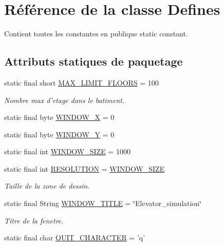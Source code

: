 \hypertarget{classDefines}{\section{Référence de la classe Defines}
\label{classDefines}
}


Contient toutes les constantes en publique static constant.  


\subsection*{Attributs statiques de paquetage}
\begin{DoxyCompactItemize}
\item 
static final short \hyperlink{classDefines_af60ebfd414a20ac9a7071d1d2a8cddca}{M\-A\-X\-\_\-\-L\-I\-M\-I\-T\-\_\-\-F\-L\-O\-O\-R\-S} = 100
\begin{DoxyCompactList}\small\item\em Nombre max d'etage dans le batiment. \end{DoxyCompactList}\item 
static final byte \hyperlink{classDefines_a191ee33a73c60eed6efed2b7dfd5947d}{W\-I\-N\-D\-O\-W\-\_\-\-X} = 0
\item 
static final byte \hyperlink{classDefines_a15d26191713a84100e6850d2ba539d8f}{W\-I\-N\-D\-O\-W\-\_\-\-Y} = 0
\item 
static final int \hyperlink{classDefines_aafb660e1c1534aec4d2cee6cfe57029f}{W\-I\-N\-D\-O\-W\-\_\-\-S\-I\-Z\-E} = 1000
\item 
static final int \hyperlink{classDefines_acd16804e8dcad6ce6fe8ad2e1b3f99e0}{R\-E\-S\-O\-L\-U\-T\-I\-O\-N} = \hyperlink{classDefines_aafb660e1c1534aec4d2cee6cfe57029f}{W\-I\-N\-D\-O\-W\-\_\-\-S\-I\-Z\-E}
\begin{DoxyCompactList}\small\item\em Taille de la zone de dessin. \end{DoxyCompactList}\item 
static final String \hyperlink{classDefines_a4f7489d3112fc05c39005576c0783f92}{W\-I\-N\-D\-O\-W\-\_\-\-T\-I\-T\-L\-E} = \char`\"{}Elevator\-\_\-simulation\char`\"{}
\begin{DoxyCompactList}\small\item\em Titre de la fenetre. \end{DoxyCompactList}\item 
static final char \hyperlink{classDefines_a5e2c85208d5085083f98e27eb616e56a}{Q\-U\-I\-T\-\_\-\-C\-H\-A\-R\-A\-C\-T\-E\-R} = 'q'

\end{DoxyCompactItemize}
